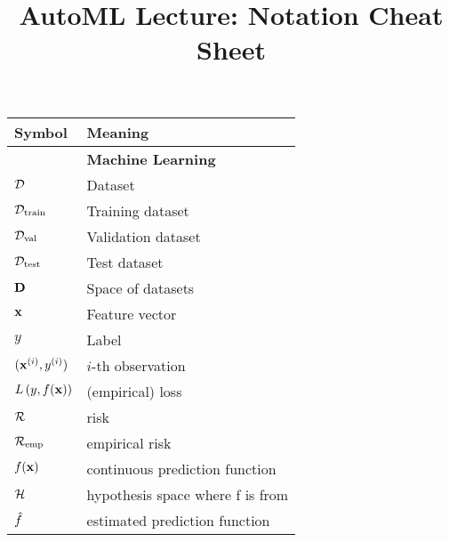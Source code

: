 \documentclass[]{report}
\title{AutoML Lecture: Notation Cheat Sheet}
\author{}
\date{}
\begin{document}
\maketitle

\begin{table}
	\begin{tabular}{ll}
		\toprule
		Symbol & Meaning \\
		\midrule
		\multicolumn{2}{c}{\textbf{Machine Learning}}\\
     	$\mathcal{D}$ & Dataset\\
     	$\mathcal{D}_{\text{train}}$ & Training dataset\\
	   	$\mathcal{D}_{\text{val}}$ & Validation dataset\\
     	$\mathcal{D}_{\text{test}}$ & Test dataset\\
		$\mathbf{D}$ & Space of datasets\\
     	$\mathbf{x}$ & Feature vector \\
     	$y$ & Label \\
     	$(\mathbf{x}^{(i)},y^{(i)})$ & $i$-th observation\\
		$L\left(y, f(\mathbf{x})\right)$ & (empirical) loss\\
		$\mathcal{R}$ & risk\\
		$\mathcal{R}_{\text{emp}}$ & empirical risk\\
		$f(\mathbf{x})$ & continuous prediction function \\
		$\mathcal{H}$ & hypothesis space where f is from \\
		$\hat{f}$ & estimated prediction function \\


\end{tabular}
\end{table}
\end{document}
